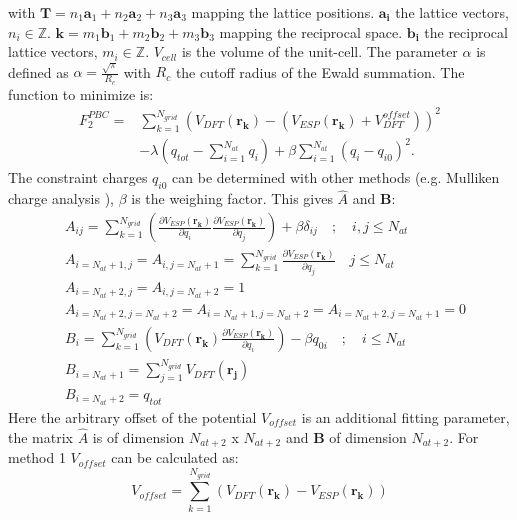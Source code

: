 \documentclass[12pt,a4paper,twoside,openany,titlepage,final]{book}
\begin{document}
with $\mathbf{T}=n_1\mathbf{a}_1+n_2\mathbf{a}_2+n_3\mathbf{a}_3$ mapping the lattice positions. $\mathbf{a_i}$ the lattice vectors, 
$n_i \in \mathbb{Z}$. $\mathbf{k}=m_1\mathbf{b}_1+m_2\mathbf{b}_2+m_3\mathbf{b}_3$ mapping the reciprocal space. $\mathbf{b_i}$ the 
reciprocal lattice vectors, $m_i \in \mathbb{Z}$. $V_{cell}$ is the volume of the unit-cell. The parameter $\alpha$ is 
defined as $\alpha=\frac{\sqrt{\pi}}{R_c}$ with $R_c$ the cutoff radius of the Ewald summation. The function to minimize is:
\begin{align}
 F_2^{PBC}=&\sum_{k=1}^{N_{grid}}\left(V_{DFT}(\mathbf{r_k})-\left(V_{ESP}(\mathbf{r_k})+V_{DFT}^{offset}\right)\right)^2\\\nonumber
           &-\lambda\left(q_{tot}-\sum_{i=1}^{N_{at}}q_i\right)+\beta\sum_{i=1}^{N_{at}}\left(q_i-q_{i0}\right)^2. \label{F_esp_pbc2}
\end{align}
The constraint charges $q_{i0}$ can be determined with other methods (e.g. Mulliken charge analysis \cite{Mulliken55}), $\beta$ is the 
weighing factor. This gives $\hat{A}$ and $\mathbf{B}$:
\begin{align}
 &A_{ij}=\sum_{k=1}^{N_{grid}}\left(\frac{\partial V_{ESP}(\mathbf{r_k})}{\partial q_i}\frac{\partial V_{ESP}(\mathbf{r_k})}{\partial q_j}\right)+\beta\delta_{ij} \quad\mathrm{;}\quad i,j\leq N_{at}\\\nonumber
 &A_{i=N_{at}+1,j}=A_{i,j=N_{at}+1}=\sum_{k=1}^{N_{grid}}\frac{\partial V_{ESP}(\mathbf{r_k})}{\partial q_j}\quad j\leq N_{at}\\\nonumber
 &A_{i=N_{at}+2,j}=A_{i,j=N_{at}+2}=1\\\nonumber
 &A_{i=N_{at}+2,j=N_{at}+2}=A_{i=N_{at}+1,j=N_{at}+2}=A_{i=N_{at}+2,j=N_{at}+1}=0\\\nonumber
 &B_{i}=\sum_{k=1}^{N_{grid}}\left(V_{DFT}(\mathbf{r_k})\frac{\partial V_{ESP}(\mathbf{r_k})}{\partial q_i}\right)-\beta q_{0i} \quad \mathrm{;} \quad i\leq N_{at}\\\nonumber
 &B_{i=N_{at}+1}=\sum_{j=1}^{N_{grid}}V_{DFT}(\mathbf{r_j})\\\nonumber
 &B_{i=N_{at}+2}=q_{tot}\nonumber
\end{align}
Here the arbitrary offset of the potential $V_{offset}$ is an additional fitting parameter, the matrix $\hat{A}$ is of dimension $N_{at+2}$ x $N_{at+2}$ and $\mathbf{B}$  of dimension $N_{at+2}$. 
For method 1 $V_{offset}$ can be calculated as:
\begin{equation}
 V_{offset}=\sum_{k=1}^{N_{grid}}\left( V_{DFT} (\mathbf{r_k})-V_{ESP}(\mathbf{r_k})\right)
\end{equation}
\end{document}
